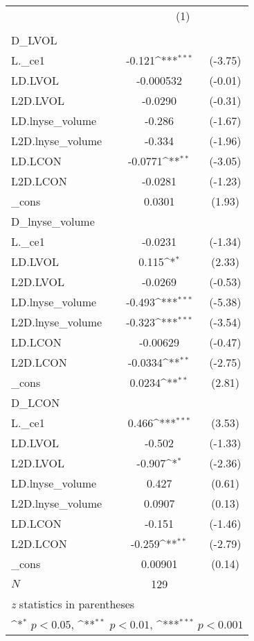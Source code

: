 {
\def\sym#1{\ifmmode^{#1}\else\(^{#1}\)\fi}
\begin{tabular}{l*{1}{cc}}
\hline\hline
          &\multicolumn{2}{c}{(1)}     \\
          &\multicolumn{2}{c}{}        \\
\hline
D\_LVOL    &                  &         \\
L.\_ce1    &   -0.121\sym{***}&  (-3.75)\\
LD.LVOL   &-0.000532         &  (-0.01)\\
L2D.LVOL  &  -0.0290         &  (-0.31)\\
LD.lnyse\_volume&   -0.286         &  (-1.67)\\
L2D.lnyse\_volume&   -0.334         &  (-1.96)\\
LD.LCON   &  -0.0771\sym{**} &  (-3.05)\\
L2D.LCON  &  -0.0281         &  (-1.23)\\
\_cons    &   0.0301         &   (1.93)\\
\hline
D\_lnyse\_volume&                  &         \\
L.\_ce1    &  -0.0231         &  (-1.34)\\
LD.LVOL   &    0.115\sym{*}  &   (2.33)\\
L2D.LVOL  &  -0.0269         &  (-0.53)\\
LD.lnyse\_volume&   -0.493\sym{***}&  (-5.38)\\
L2D.lnyse\_volume&   -0.323\sym{***}&  (-3.54)\\
LD.LCON   & -0.00629         &  (-0.47)\\
L2D.LCON  &  -0.0334\sym{**} &  (-2.75)\\
\_cons    &   0.0234\sym{**} &   (2.81)\\
\hline
D\_LCON    &                  &         \\
L.\_ce1    &    0.466\sym{***}&   (3.53)\\
LD.LVOL   &   -0.502         &  (-1.33)\\
L2D.LVOL  &   -0.907\sym{*}  &  (-2.36)\\
LD.lnyse\_volume&    0.427         &   (0.61)\\
L2D.lnyse\_volume&   0.0907         &   (0.13)\\
LD.LCON   &   -0.151         &  (-1.46)\\
L2D.LCON  &   -0.259\sym{**} &  (-2.79)\\
\_cons    &  0.00901         &   (0.14)\\
\hline
\(N\)     &      129         &         \\
\hline\hline
\multicolumn{3}{l}{\footnotesize \textit{z} statistics in parentheses}\\
\multicolumn{3}{l}{\footnotesize \sym{*} \(p<0.05\), \sym{**} \(p<0.01\), \sym{***} \(p<0.001\)}\\
\end{tabular}
}
